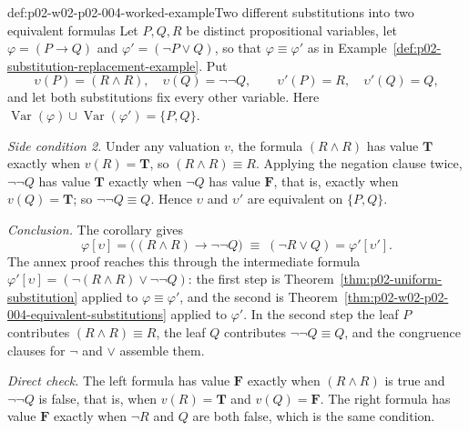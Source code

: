 \begin{hbexample}{def:p02-w02-p02-004-worked-example}{Two different substitutions into two equivalent formulas}
Let \(P,Q,R\) be distinct propositional variables, let
\(\varphi=(P\to Q)\) and \(\varphi'=(\neg P\lor Q)\), so that
\(\varphi\equiv\varphi'\) as in
Example~\ref{def:p02-substitution-replacement-example}.  Put
\[
 \upsilon(P)=(R\land R),\quad \upsilon(Q)=\neg\neg Q,\qquad
 \upsilon'(P)=R,\quad \upsilon'(Q)=Q,
\]
and let both substitutions fix every other variable.  Here
\(\operatorname{Var}(\varphi)\cup\operatorname{Var}(\varphi')=\{P,Q\}\).

\emph{Side condition 2.}  Under any valuation \(v\), the formula
\((R\land R)\) has value \(\mathbf T\) exactly when \(v(R)=\mathbf T\), so
\((R\land R)\equiv R\).  Applying the negation clause twice,
\(\neg\neg Q\) has value \(\mathbf T\) exactly when \(\neg Q\) has value
\(\mathbf F\), that is, exactly when \(v(Q)=\mathbf T\); so
\(\neg\neg Q\equiv Q\).  Hence \(\upsilon\) and \(\upsilon'\) are equivalent
on \(\{P,Q\}\).

\emph{Conclusion.}  The corollary gives
\[
 \varphi[\upsilon]=\bigl((R\land R)\to\neg\neg Q\bigr)
 \;\equiv\;
 (\neg R\lor Q)=\varphi'[\upsilon'].
\]
The annex proof reaches this through the intermediate formula
\(\varphi'[\upsilon]=(\neg(R\land R)\lor\neg\neg Q)\): the first step is
Theorem~\ref{thm:p02-uniform-substitution} applied to
\(\varphi\equiv\varphi'\), and the second is
Theorem~\ref{thm:p02-w02-p02-004-equivalent-substitutions} applied to
\(\varphi'\).  In the second step the leaf \(P\) contributes
\((R\land R)\equiv R\), the leaf \(Q\) contributes
\(\neg\neg Q\equiv Q\), and the congruence clauses for \(\neg\) and \(\lor\)
assemble them.

\emph{Direct check.}  The left formula has value \(\mathbf F\) exactly when
\((R\land R)\) is true and \(\neg\neg Q\) is false, that is, when
\(v(R)=\mathbf T\) and \(v(Q)=\mathbf F\).  The right formula has value
\(\mathbf F\) exactly when \(\neg R\) and \(Q\) are both false, which is the
same condition.
\end{hbexample}

